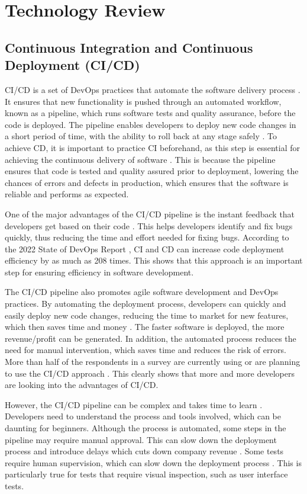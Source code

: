 \chapter{Technology Review}

\section{Continuous Integration and Continuous Deployment (CI/CD)}
CI/CD is a set of DevOps practices that automate the software delivery process \cite{saarenpaa2020creating}. It ensures that new functionality is pushed through an automated workflow, known as a pipeline, which runs software tests and quality assurance, before the code is deployed. The pipeline enables developers to deploy new code changes in a short period of time, with the ability to roll back at any stage safely \cite{bs}. To achieve CD, it is important to practice CI beforehand, as this step is essential for achieving the continuous delivery of software \cite{dsmgm}. This is because the pipeline ensures that code is tested and quality assured prior to deployment, lowering the chances of errors and defects in production, which ensures that the software is reliable and performs as expected. 

One of the major advantages of the CI/CD pipeline is the instant feedback that developers get based on their code \cite{bs}. This helps developers identify and fix bugs quickly, thus reducing the time and effort needed for fixing bugs. According to the 2022 State of DevOps Report \cite{clark}, CI and CD can increase code deployment efficiency by as much as 208 times. This shows that this approach is an important step for ensuring efficiency in software development. 

The CI/CD pipeline also promotes agile software development and DevOps practices. By automating the deployment process, developers can quickly and easily deploy new code changes, reducing the time to market for new features, which then saves time and money \cite{bs, phillips2015manager}. The faster software is deployed, the more revenue/profit can be generated. In addition, the automated process reduces the need for manual intervention, which saves time and reduces the risk of errors. More than half of the respondents in a survey are currently using or are planning to use the CI/CD approach \cite{clark}. This clearly shows that more and more developers are looking into the advantages of CI/CD.

However, the CI/CD pipeline can be complex and takes time to learn \cite{sander}. Developers need to understand the process and tools involved, which can be daunting for beginners. Although the process is automated, some steps in the pipeline may require manual approval. This can slow down the deployment process and introduce delays which cuts down company revenue \cite{sb}. Some tests require human supervision, which can slow down the deployment process \cite{laster}. This is particularly true for tests that require visual inspection, such as user interface tests.

